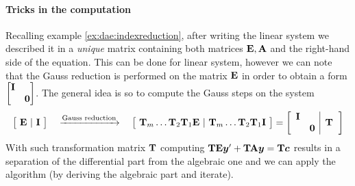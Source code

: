 	\paragraph{Tricks in the computation} Recalling example \ref{ex:dae:indexreduction}, after writing the linear system we described it in a \textit{unique} matrix containing both matrices $\mathbf{E},\mathbf{A}$ and the right-hand side of the equation. This can be done for linear system, however we can note that the Gauss reduction is performed on the matrix $\mathbf{E}$ in order to obtain a form $\begin{bmatrix} \mathbf{I} \\ & \mathbf{0} \end{bmatrix}$. The general idea is so to compute the Gauss steps on the system
	\[ \begin{bmatrix}  \ \mathbf{E} \ | \ \mathbf{I} \  \end{bmatrix} \quad \xrightarrow{\textrm{Gauss  reduction}} \quad  \begin{bmatrix} \ \mathbf{T}_m\dots \mathbf{T}_2 \mathbf{T}_1 \mathbf{E} \ | \ \mathbf{T}_m\dots \mathbf{T}_2 \mathbf{T}_1 \mathbf{I}\  \end{bmatrix} =  \left[ \begin{array} {c  c |} 
		\mathbf{I} & \\ & \mathbf{0}
	\end{array} \hspace{2mm} \mathbf{T} \hspace{2mm} \right] \]
	With such transformation matrix $\mathbf{T}$ computing $\mathbf{TE} \boldsymbol{y}' + \mathbf{TA} \boldsymbol{y} = \mathbf{T} \boldsymbol{c}$ results in a separation of the differential part from the algebraic one and we can apply the algorithm (by deriving the algebraic part and iterate).
	
